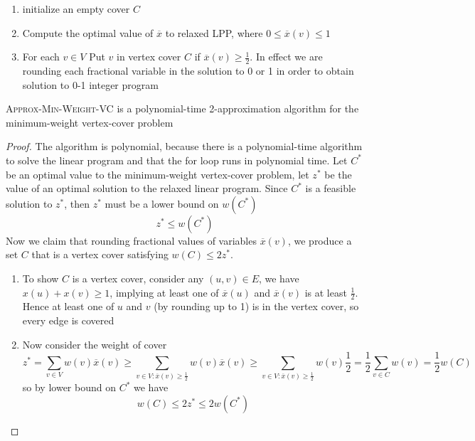 \documentclass[11pt]{article}
\begin{document}
\begin{defn*}
\begin{enumerate}
        \begin{enumerate}
            \item initialize an empty cover $C$
            \item Compute the optimal value of $\overline{x}$ to relaxed LPP, where $0 \leq \overline{x}(v) \leq 1$
            \item For each $v\in V$ Put $v$ in vertex cover $C$ if $\overline{x}(v) \geq \frac{1}{2}$. In effect we are rounding each fractional variable in the solution to 0 or 1 in order to obtain solution to 0-1 integer program 
        \end{enumerate}
    \end{enumerate}
\end{defn*}


\begin{theorem*}
    \textsc{Approx-Min-Weight-VC} is a polynomial-time 2-approximation algorithm for the minimum-weight vertex-cover problem
    \begin{proof}
        The algorithm is polynomial, because there is a polynomial-time algorithm to solve the linear program and that the for loop runs in polynomial time. Let $C^*$ be an optimal value to the minimum-weight vertex-cover problem, let $z^*$ be the value of an optimal solution to the relaxed linear program. Since $C^*$ is a feasible solution to $z^*$, then $z^*$ must be a lower bound on $w(C^*)$
        \[
            z^* \leq w(C^*)
        \]
        Now we claim that rounding fractional values of variables $\overline{x}(v)$, we produce a set $C$ that is a vertex cover satisfying $w(C) \leq 2z^*$. 
        \begin{enumerate}
            \item To show $C$ is a vertex cover, consider any $(u,v)\in E$, we have $x(u) + x(v) \geq 1$, implying at least one of $\overline{x}(u)$ and $\overline{x}(v)$ is at least $\frac{1}{2}$. Hence at least one of $u$ and $v$ (by rounding up to 1) is in the vertex cover, so every edge is covered 
            \item Now consider the weight of cover 
            \[
                z^* = \sum_{v\in V} w(v)\overline{x}(v) \geq 
                        \sum_{v\in V: \overline{x}(v)\geq \frac{1}{2}} w(v)\overline{x}(v) \geq 
                        \sum_{v\in V: \overline{x}(v)\geq \frac{1}{2}} w(v)\frac{1}{2} = \frac{1}{2} \sum_{v\in C} w(v) = \frac{1}{2} w(C)
            \]
            so by lower bound on $C^*$ we have 
            \[
                w(C) \leq 2z^* \leq 2w(C^*)
            \]
        \end{enumerate}
    \end{proof}
\end{theorem*}
\end{document}
